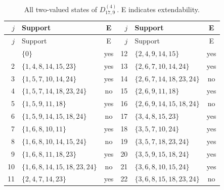 \documentclass[aps,pra,reprint,superscriptaddress,longbibliography,nofootinbib,floatfix,10pt]{revtex4-2}
\theoremstyle{definition}
\begin{document}
\begin{longtable}{rlc@{\qquad}rlc}
\caption{All two-valued states of $D_{17,9}^{(4)}$. E indicates extendability.}\label{tab:states-4e}\\\toprule $j$ & Support & E & $j$ & Support & E\\\midrule\endfirsthead
\toprule $j$ & Support & E & $j$ & Support & E\\\midrule\endhead\bottomrule\endfoot
1 & $\{0\}$ & yes & 12 & $\{2,\allowbreak 4,\allowbreak 9,\allowbreak 14,\allowbreak 15\}$ & yes\\
2 & $\{1,\allowbreak 4,\allowbreak 8,\allowbreak 14,\allowbreak 15,\allowbreak 23\}$ & yes & 13 & $\{2,\allowbreak 6,\allowbreak 7,\allowbreak 10,\allowbreak 14,\allowbreak 24\}$ & yes\\
3 & $\{1,\allowbreak 5,\allowbreak 7,\allowbreak 10,\allowbreak 14,\allowbreak 24\}$ & yes & 14 & $\{2,\allowbreak 6,\allowbreak 7,\allowbreak 14,\allowbreak 18,\allowbreak 23,\allowbreak 24\}$ & no\\
4 & $\{1,\allowbreak 5,\allowbreak 7,\allowbreak 14,\allowbreak 18,\allowbreak 23,\allowbreak 24\}$ & no & 15 & $\{2,\allowbreak 6,\allowbreak 9,\allowbreak 11,\allowbreak 18\}$ & yes\\
5 & $\{1,\allowbreak 5,\allowbreak 9,\allowbreak 11,\allowbreak 18\}$ & yes & 16 & $\{2,\allowbreak 6,\allowbreak 9,\allowbreak 14,\allowbreak 15,\allowbreak 18,\allowbreak 24\}$ & no\\
6 & $\{1,\allowbreak 5,\allowbreak 9,\allowbreak 14,\allowbreak 15,\allowbreak 18,\allowbreak 24\}$ & no & 17 & $\{3,\allowbreak 4,\allowbreak 8,\allowbreak 15,\allowbreak 23\}$ & yes\\
7 & $\{1,\allowbreak 6,\allowbreak 8,\allowbreak 10,\allowbreak 11\}$ & yes & 18 & $\{3,\allowbreak 5,\allowbreak 7,\allowbreak 10,\allowbreak 24\}$ & yes\\
8 & $\{1,\allowbreak 6,\allowbreak 8,\allowbreak 10,\allowbreak 14,\allowbreak 15,\allowbreak 24\}$ & no & 19 & $\{3,\allowbreak 5,\allowbreak 7,\allowbreak 18,\allowbreak 23,\allowbreak 24\}$ & yes\\
9 & $\{1,\allowbreak 6,\allowbreak 8,\allowbreak 11,\allowbreak 18,\allowbreak 23\}$ & yes & 20 & $\{3,\allowbreak 5,\allowbreak 9,\allowbreak 15,\allowbreak 18,\allowbreak 24\}$ & yes\\
10 & $\{1,\allowbreak 6,\allowbreak 8,\allowbreak 14,\allowbreak 15,\allowbreak 18,\allowbreak 23,\allowbreak 24\}$ & no & 21 & $\{3,\allowbreak 6,\allowbreak 8,\allowbreak 10,\allowbreak 15,\allowbreak 24\}$ & yes\\
11 & $\{2,\allowbreak 4,\allowbreak 7,\allowbreak 14,\allowbreak 23\}$ & yes & 22 & $\{3,\allowbreak 6,\allowbreak 8,\allowbreak 15,\allowbreak 18,\allowbreak 23,\allowbreak 24\}$ & no\\
\end{longtable}\endgroup
\end{document}
